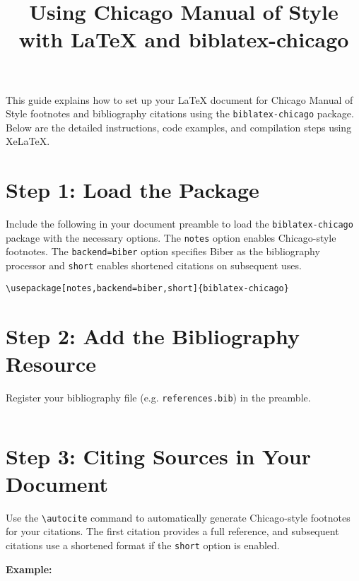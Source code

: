 \documentclass{article}
\title{Using Chicago Manual of Style with LaTeX and biblatex-chicago}
\author{}
\date{}
\begin{document}
\maketitle

This guide explains how to set up your LaTeX document for Chicago Manual of Style footnotes and bibliography citations using the \texttt{biblatex-chicago} package. Below are the detailed instructions, code examples, and compilation steps using XeLaTeX.

\bigskip

\section*{Step 1: Load the Package}

Include the following in your document preamble to load the \texttt{biblatex-chicago} package with the necessary options. The \texttt{notes} option enables Chicago-style footnotes. The \texttt{backend=biber} option specifies Biber as the bibliography processor and \texttt{short} enables shortened citations on subsequent uses.

\begin{lstlisting}
\usepackage[notes,backend=biber,short]{biblatex-chicago}
\end{lstlisting}

\bigskip

\section*{Step 2: Add the Bibliography Resource}

Register your bibliography file (e.g. \texttt{references.bib}) in the preamble.

\begin{lstlisting}

\end{lstlisting}

\bigskip

\section*{Step 3: Citing Sources in Your Document}

Use the \verb|\autocite| command to automatically generate Chicago-style footnotes for your citations. The first citation provides a full reference, and subsequent citations use a shortened format if the \texttt{short} option is enabled.

\textbf{Example:}
\end{document}
